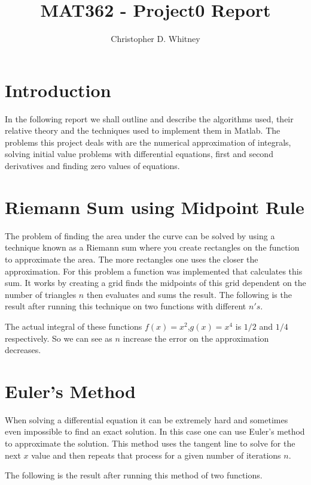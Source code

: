 \documentclass{article}
\begin{document}
\title{MAT362 - Project0 Report}
\author{Christopher D. Whitney}

\maketitle

\section{Introduction}

In the following report we shall outline and describe the algorithms used, their relative theory and the techniques used to implement them in Matlab. The problems this project deals with are the numerical approximation of integrals, solving initial value problems with differential equations, first and second derivatives and finding zero values of equations. 

\section{Riemann Sum using Midpoint Rule}
The problem of finding the area under the curve can be solved by using a technique known as a Riemann sum where you create rectangles on the function to approximate the area. The more rectangles one uses the closer the approximation. For this problem a function was implemented that calculates this sum. It works by creating a grid finds the midpoints of this grid dependent on the number of triangles $n$ then evaluates and sums the result. The following is the result after running this technique on two functions with different $n's$. 



The actual integral of these functions $f(x)=x^2$,$g(x) = x^4$ is $1/2$ and $1/4$ respectively. So we can see as $n$ increase the error on the approximation decreases. 

\section{Euler's Method}
When solving a differential equation it can be extremely hard and sometimes even impossible to find an exact solution. In this case one can use Euler's method to approximate the solution. This method uses the tangent line to solve for the next $x$ value and then repeats that process for a given number of iterations $n$. 

The following is the result after running this method of two functions.
\end{document}

